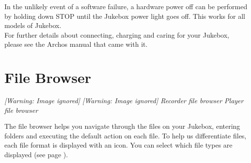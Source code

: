 In the unlikely event of a software failure, a hardware power off can be
performed by holding down STOP until the Jukebox power light goes off. 
This works for all models of Jukebox.\\

For further details about connecting, charging and caring for your
Jukebox, please see the Archos manual that came with it.

\section{\label{ref:PartIIFB}File Browser}
{\centering\itshape
  [Warning: Image ignored] %
     [Warning: Image ignored] %
 \newline
Recorder file browser  Player file browser  
\par}
The file browser helps you navigate through the files on your Jukebox,
entering folders and executing the default action on each file. To help
us differentiate files, each file format is displayed with an icon. You
can select which file types are displayed (see page
\pageref{ref:ShowFiles}).

